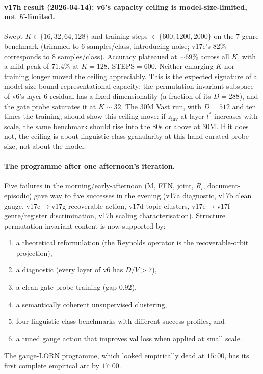 \documentclass[11pt, a4paper]{article}
\theoremstyle{plain}
\theoremstyle{definition}
\theoremstyle{remark}
\begin{document}
\paragraph{v17h result (2026-04-14): v6's capacity ceiling is model-size-limited, not $K$-limited.}
Swept $K \in \{16, 32, 64, 128\}$ and training steps $\in \{600, 1200, 2000\}$ on the 7-genre benchmark (trimmed to 6 samples/class, introducing noise; v17e's 82\% corresponds to 8 samples/class).
Accuracy plateaued at $\sim 69\%$ across all $K$, with a mild peak of $71.4\%$ at $K{=}128$, STEPS$=600$.
Neither enlarging $K$ nor training longer moved the ceiling appreciably.
This is the expected signature of a model-size-bound representational capacity: the permutation-invariant subspace of v6's layer-6 residual has a fixed dimensionality (a fraction of its $D = 288$), and the gate probe saturates it at $K \sim 32$.
The 30M Vast run, with $D = 512$ and ten times the training, should show this ceiling move: if $z_{\mathrm{inv}}$ at layer $l^*$ increases with scale, the same benchmark should rise into the 80s or above at 30M.
If it does not, the ceiling is about linguistic-class granularity at this hand-curated-probe size, not about the model.

\paragraph{The programme after one afternoon's iteration.}
Five failures in the morning/early-afternoon (M, FFN, joint, $R_l$, document-episodic) gave way to five successes in the evening (v17a diagnostic, v17b clean gauge, v17c$\rightarrow$v17g recoverable action, v17d topic clusters, v17e$\rightarrow$v17f genre/register discrimination, v17h scaling characterisation).
Structure = permutation-invariant content is now supported by:
\begin{enumerate}[nosep,leftmargin=2em]
\item a theoretical reformulation (the Reynolds operator is the recoverable-orbit projection),
\item a diagnostic (every layer of v6 has $D/V > 7$),
\item a clean gate-probe training (gap $0.92$),
\item a semantically coherent unsupervised clustering,
\item four linguistic-class benchmarks with different success profiles, and
\item a tuned gauge action that improves val loss when applied at small scale.
\end{enumerate}
The gauge-LORN programme, which looked empirically dead at $15{:}00$, has its first complete empirical arc by $17{:}00$.
\end{document}
